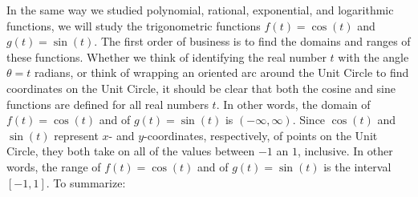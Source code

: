 In the same way we studied polynomial, rational, exponential, and logarithmic functions, we will study the trigonometric functions $f(t) = \cos(t)$ and $g(t) = \sin(t)$.  The first order of business is to find the domains and ranges of these functions.  Whether we think of identifying the real number $t$ with the angle $\theta = t$ radians, or think of wrapping an oriented arc around the Unit Circle to find coordinates on the Unit Circle, it should be clear that both the cosine and sine functions are defined for all real numbers $t$.  In other words, the domain  of $f(t) = \cos(t)$ and of $g(t) = \sin(t)$ is $(-\infty, \infty)$.  Since $\cos(t)$ and $\sin(t)$ represent $x$- and $y$-coordinates, respectively, of points on the Unit Circle, they both take on all of the values between $-1$ an $1$, inclusive.  In other words, the range of $f(t) = \cos(t)$ and of $g(t) = \sin(t)$ is the interval $[-1,1]$.  To summarize:


\smallskip


\smallskip
{}
\label{cosinesineequationsrealnumbers}

